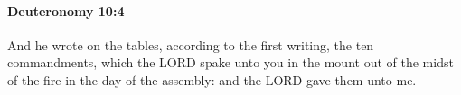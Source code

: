 
		\paragraph{Deuteronomy 10:4} %
			\label{DEUTERONOMY-10-4}

			And he wrote on the tables, according to the first writing, the ten commandments, which the LORD spake unto you in the mount out of the midst of the fire in the day of the assembly: and the LORD gave them unto me.


